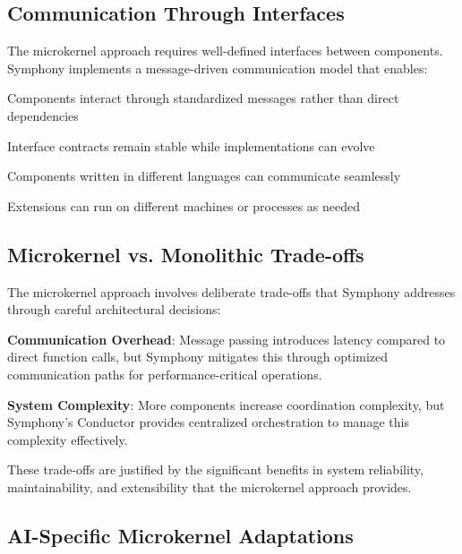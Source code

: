 \subsection*{Communication Through Interfaces}

The microkernel approach requires well-defined interfaces between components. Symphony implements a \textcolor{brandSecondary}{message-driven communication model} that enables:

\begin{description}[leftmargin=3cm,labelwidth=2.5cm]
    \item[\textbf{Loose Coupling}] Components interact through standardized messages rather than direct dependencies
    \item[\textbf{Protocol Stability}] Interface contracts remain stable while implementations can evolve
    \item[\textbf{Cross-Language Support}] Components written in different languages can communicate seamlessly
    \item[\textbf{Distributed Deployment}] Extensions can run on different machines or processes as needed
\end{description}

\subsection*{Microkernel vs. Monolithic Trade-offs}

The microkernel approach involves deliberate trade-offs that Symphony addresses through careful architectural decisions:

\begin{infobox}[title=Architectural Trade-offs]
\textbf{Communication Overhead}: Message passing introduces latency compared to direct function calls, but Symphony mitigates this through optimized communication paths for performance-critical operations.

\textbf{System Complexity}: More components increase coordination complexity, but Symphony's Conductor provides centralized orchestration to manage this complexity effectively.
\end{infobox}

These trade-offs are justified by the significant benefits in system reliability, maintainability, and extensibility that the microkernel approach provides.

\subsection*{AI-Specific Microkernel Adaptations}


